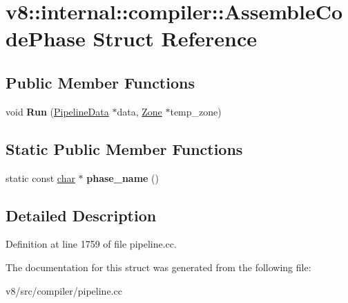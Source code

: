 \hypertarget{structv8_1_1internal_1_1compiler_1_1AssembleCodePhase}{}\section{v8\+:\+:internal\+:\+:compiler\+:\+:Assemble\+Code\+Phase Struct Reference}
\label{structv8_1_1internal_1_1compiler_1_1AssembleCodePhase}
\subsection*{Public Member Functions}
\begin{DoxyCompactItemize}
\item 
\mbox{\label{structv8_1_1internal_1_1compiler_1_1AssembleCodePhase_a164b51255d76a95cd71701b43177ab25}} 
void {\bfseries Run} (\mbox{\hyperlink{classv8_1_1internal_1_1compiler_1_1PipelineData}{Pipeline\+Data}} $\ast$data, \mbox{\hyperlink{classv8_1_1internal_1_1Zone}{Zone}} $\ast$temp\+\_\+zone)
\end{DoxyCompactItemize}
\subsection*{Static Public Member Functions}
\begin{DoxyCompactItemize}
\item 
\mbox{\label{structv8_1_1internal_1_1compiler_1_1AssembleCodePhase_a5cac0287db2d8ec7e56439e79dc5b5f2}} 
static const \mbox{\hyperlink{classchar}{char}} $\ast$ {\bfseries phase\+\_\+name} ()
\end{DoxyCompactItemize}


\subsection{Detailed Description}


Definition at line 1759 of file pipeline.\+cc.



The documentation for this struct was generated from the following file\+:\begin{DoxyCompactItemize}
\item 
v8/src/compiler/pipeline.\+cc\end{DoxyCompactItemize}
